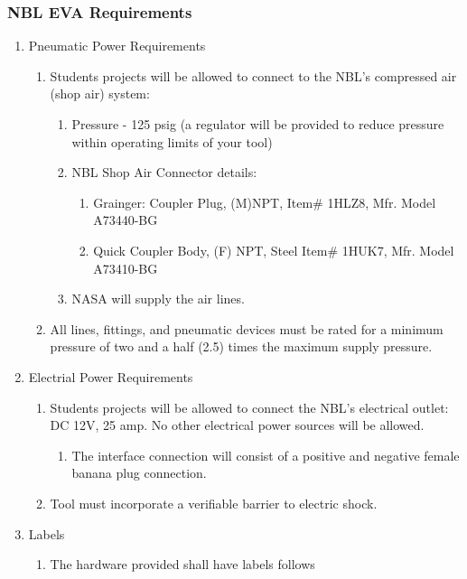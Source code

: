 \documentclass{article}
\begin{document}
\subsubsection{NBL EVA Requirements}
\begin{enumerate}
    \item Pneumatic Power Requirements
    \begin{enumerate}
        \item Students projects will be allowed to connect to the NBL's compressed air (shop air) system:
        \begin{enumerate}
            \item Pressure - 125 psig (a regulator will be provided to reduce pressure within operating limits of your tool)
            \item NBL Shop Air Connector details:
            \begin{enumerate}
                \item Grainger: Coupler Plug, (M)NPT, Item# 1HLZ8, Mfr. Model A73440-BG
                \item Quick Coupler Body, (F) NPT, Steel Item# 1HUK7, Mfr. Model A73410-BG
            \end{enumerate}
            \item NASA will supply the air lines.
        \end{enumerate}
        \item All lines, fittings, and pneumatic devices must be rated for a minimum pressure of two and a half (2.5) times the maximum supply pressure.
    \end{enumerate}
    \item Electrial Power Requirements
    \begin{enumerate}
        \item Students projects will be allowed to connect the NBL's electrical outlet: DC 12V, 25 amp. No other electrical power sources will be allowed.
        \begin{enumerate}
            \item The interface connection will consist of a positive and negative female banana plug connection.
        \end{enumerate}
        \item Tool must incorporate a verifiable barrier to electric shock.
    \end{enumerate}
    \item Labels
    \begin{enumerate}
        \item The hardware provided shall have labels follows

\end{enumerate}
\end{enumerate}
\end{document}
